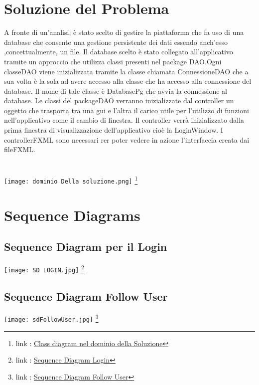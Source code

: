 \documentclass[11pt]{article}
\begin{document}
	\clearpage
	
	\section{Soluzione del Problema}
	A fronte di un’analisi, è stato scelto di gestire la piattaforma che fa uso di una database che consente una gestione persistente dei dati essendo anch'esso ,concettualmente, un file. 
	Il database scelto è stato collegato all'applicativo tramite un approccio che utilizza classi presenti nel package DAO.Ogni classeDAO viene inizializzata tramite la classe chiamata ConnessioneDAO 
	che a sua volta è la sola ad avere accesso alla classe che ha accesso alla connessione del database. Il nome di tale classe è DatabasePg che avvia la connessione al database.
	Le classi del packageDAO verranno inizializzate dal controller un oggetto che trasporta tra una gui e l'altra il carico utile per l'utilizzo di funzioni nell'applicativo come il cambio di finestra.
	Il controller verrà inizializzato dalla prima finestra di visualizzazione dell'applicativo cioè la LoginWindow. I controllerFXML sono necessari rer poter vedere in azione l'interfaccia creata dai fileFXML.
	\\
	\\
	\\
	\texttt{[image: dominio Della soluzione.png]} \footnote{link : \href{https://github.com/torcy-it/LettoreMusicale/tree/main/DocumentazioneProgetto/ClassDiagrams}{Class diagram nel dominio della Soluzione}}
	
	\clearpage
	\section{Sequence Diagrams}
	\subsection{Sequence Diagram per il Login}
	\texttt{[image: SD LOGIN.jpg]} \footnote{link : \href{https://github.com/torcy-it/LettoreMusicale/tree/main/DocumentazioneProgetto/SequenceDiagrams}{Sequence Diagram Login}}
	\clearpage
	\subsection{Sequence Diagram Follow User}
	\texttt{[image: sdFollowUser.jpg]} \footnote{link : \href{https://github.com/torcy-it/LettoreMusicale/tree/main/DocumentazioneProgetto/SequenceDiagrams}{Sequence Diagram Follow User}}
	
\end{document}
